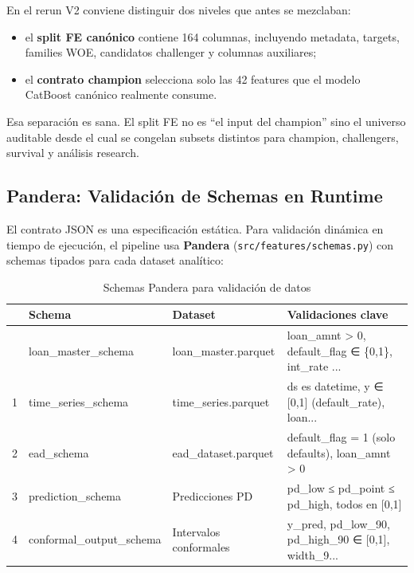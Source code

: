 \documentclass[
  spanish,
  11pt,
  letterpaper,
]{scrbook}
\providecommand{\tightlist}{%
  \setlength{\itemsep}{0pt}\setlength{\parskip}{0pt}}
\theoremstyle{plain}
\theoremstyle{remark}
\begin{document}
En el rerun V2 conviene distinguir dos niveles que antes se mezclaban:

\begin{itemize}
\tightlist
\item
  el \textbf{split FE canónico} contiene 164 columnas, incluyendo
  metadata, targets, families WOE, candidatos challenger y columnas
  auxiliares;
\item
  el \textbf{contrato champion} selecciona solo las 42 features que el
  modelo CatBoost canónico realmente consume.
\end{itemize}

Esa separación es sana. El split FE no es ``el input del champion'' sino
el universo auditable desde el cual se congelan subsets distintos para
champion, challengers, survival y análisis research.

\subsection{Pandera: Validación de Schemas en
Runtime}\label{pandera-validaciuxf3n-de-schemas-en-runtime}

El contrato JSON es una especificación estática. Para validación
dinámica en tiempo de ejecución, el pipeline usa \textbf{Pandera}
(\texttt{src/features/schemas.py}) con schemas tipados para cada dataset
analítico:

{

\begin{longtable}[]{@{}llll@{}}

\caption{\label{tbl-pandera-schemas}Schemas Pandera para validación de
datos}

\tabularnewline

\toprule\noalign{}
& Schema & Dataset & Validaciones clave \\
\midrule\noalign{}
\endhead
\bottomrule\noalign{}
\endlastfoot
0 & loan\_master\_schema & loan\_master.parquet & loan\_amnt
\textgreater{} 0, default\_flag ∈ \{0,1\}, int\_rate ... \\
1 & time\_series\_schema & time\_series.parquet & ds es datetime, y ∈
{[}0,1{]} (default\_rate), loan... \\
2 & ead\_schema & ead\_dataset.parquet & default\_flag = 1 (solo
defaults), loan\_amnt \textgreater{} 0 \\
3 & prediction\_schema & Predicciones PD & pd\_low ≤ pd\_point ≤
pd\_high, todos en {[}0,1{]} \\
4 & conformal\_output\_schema & Intervalos conformales & y\_pred,
pd\_low\_90, pd\_high\_90 ∈ {[}0,1{]}, width\_9... \\

\end{longtable}

}
\end{document}

